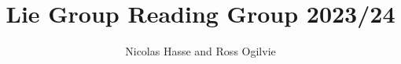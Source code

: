\documentclass[twoside,11pt,a4paper,leqno]{report}
\numberwithin{equation}{chapter}
\theoremstyle{plain}
\theoremstyle{definition}
\begin{document}
\title{Lie Group Reading Group 2023/24}
\author{Nicolas Hasse and Ross Ogilvie}
\maketitle







 

\end{document}
